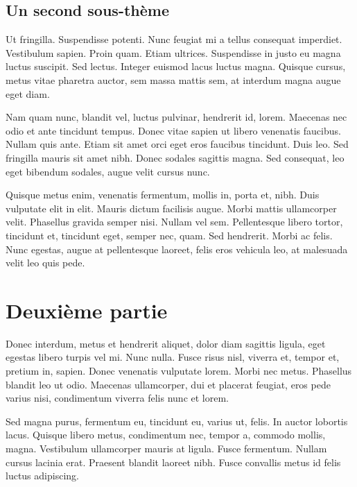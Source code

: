 \documentclass[theme=pringlea]{myrtillebook}
\begin{document}
\subsection{Un second sous-thème}

Ut fringilla. Suspendisse potenti. Nunc feugiat mi a tellus consequat imperdiet. Vestibulum sapien. Proin quam. Etiam ultrices. Suspendisse in justo eu magna luctus suscipit. Sed lectus. Integer euismod lacus luctus magna. Quisque cursus, metus vitae pharetra auctor, sem massa mattis sem, at interdum magna augue eget diam.

Nam quam nunc, blandit vel, luctus pulvinar, hendrerit id, lorem. Maecenas nec odio et ante tincidunt tempus. Donec vitae sapien ut libero venenatis faucibus. Nullam quis ante. Etiam sit amet orci eget eros faucibus tincidunt. Duis leo. Sed fringilla mauris sit amet nibh. Donec sodales sagittis magna. Sed consequat, leo eget bibendum sodales, augue velit cursus nunc.


Quisque metus enim, venenatis fermentum, mollis in, porta et, nibh. Duis vulputate elit in elit. Mauris dictum facilisis augue. Morbi mattis ullamcorper velit. Phasellus gravida semper nisi. Nullam vel sem. Pellentesque libero tortor, tincidunt et, tincidunt eget, semper nec, quam. Sed hendrerit. Morbi ac felis. Nunc egestas, augue at pellentesque laoreet, felis eros vehicula leo, at malesuada velit leo quis pede.

\section{Deuxième partie}

Donec interdum, metus et hendrerit aliquet, dolor diam sagittis ligula, eget egestas libero turpis vel mi. Nunc nulla. Fusce risus nisl, viverra et, tempor et, pretium in, sapien. Donec venenatis vulputate lorem. Morbi nec metus. Phasellus blandit leo ut odio. Maecenas ullamcorper, dui et placerat feugiat, eros pede varius nisi, condimentum viverra felis nunc et lorem.

Sed magna purus, fermentum eu, tincidunt eu, varius ut, felis. In auctor lobortis lacus. Quisque libero metus, condimentum nec, tempor a, commodo mollis, magna. Vestibulum ullamcorper mauris at ligula. Fusce fermentum. Nullam cursus lacinia erat. Praesent blandit laoreet nibh. Fusce convallis metus id felis luctus adipiscing.
\end{document}
